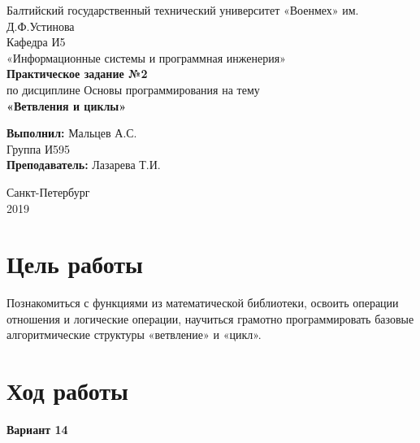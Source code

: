 \documentclass[a4paper,14pt]{extarticle}
\begin{document}
\begin{titlepage}
\centering
\small Балтийский государственный технический университет «Военмех» им. Д.Ф.Устинова \\
\vspace{3cm}
\normalsize Кафедра И5\\
«Информационные системы и программная инженерия»\\
\vspace{3cm}
\textbf{Практическое задание №2}\\
по дисциплине Основы программирования на тему\\ 
\textbf{«Ветвления и циклы»}\\
\vfill

\begin{flushleft}
\textbf{Выполнил:}
\hfill {Мальцев А.С.} \\
\hfill {Группа И595} \\
\vspace{1cm}
\textbf{Преподаватель:}
\hfill {Лазарева Т.И.} \\
\end{flushleft}
\vspace{3cm}

{\centering Санкт-Петербург \\ 
\vspace{0.15cm}
2019}
\end{titlepage}

\section{Цель работы}
Познакомиться с функциями из математической библиотеки, освоить операции отношения и логические операции, научиться грамотно программировать базовые алгоритмические структуры «ветвление» и «цикл».

\section{Ход работы}
\begin{center}
{\large\bf Вариант 14}
\end{center}
\end{document}
